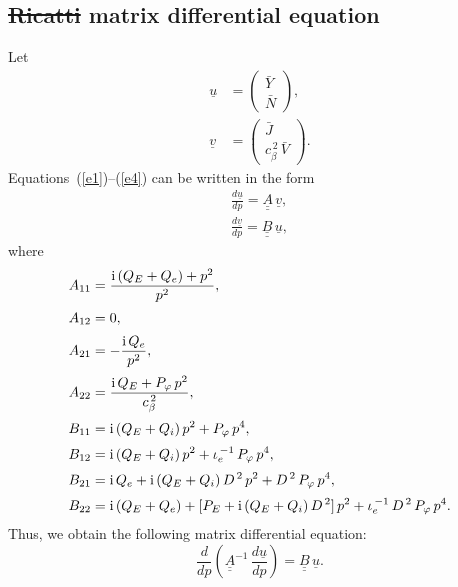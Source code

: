 \documentclass[12pt,prb,aps]{revtex4-1}
\providecommand{\DIFadd}[1]{{\protect\color{blue}\uwave{#1}}} %
\providecommand{\DIFdel}[1]{{\protect\color{red}\sout{#1}}}                      %
\providecommand{\DIFaddbegin}{} %
\providecommand{\DIFaddend}{} %
\providecommand{\DIFdelbegin}{} %
\providecommand{\DIFdelend}{} %
\begin{document}
\subsection{\DIFdelbegin \DIFdel{Ricatti }\DIFdelend \DIFaddbegin \DIFadd{Riccati }\DIFaddend matrix differential equation}
Let
\begin{align}
\underline{u}&= \left(\begin{array}{c}\bar{Y}\\\bar{N}\end{array}\right),\\[0.5ex]
\underline{v}&= \left(\begin{array}{c}\bar{J}\\c_\beta^{\,2}\,\bar{V}\end{array}\right).
\end{align}
Equations~(\ref{e1})--(\ref{e4}) can be written in the form 
\begin{align}
\frac{d\underline{u}}{dp}= \underline{\underline{A}}\,\underline{v},\\[0.5ex]
\frac{d\underline{v}}{dp}= \underline{\underline{B}}\,\underline{u},
\end{align}
where
\begin{align}
A_{11} &=  \frac{{\rm i}\,(Q_E+Q_e)+p^2}{p^2},\\[0.5ex]
A_{12}&=0,\\[0.5ex]
A_{21} &=- \frac{{\rm i}\,Q_e}{p^2},\\[0.5ex]
A_{22} &= \frac{{\rm i}\,Q_E + P_\varphi\,p^2}{c_\beta^{\,2}},\\[0.5ex]
B_{11} &= {\rm i}\,(Q_E+Q_i)\,p^2 + P_\varphi\,p^4,\\[0.5ex]
B_{12} &= {\rm i}\,(Q_E+Q_i)\,p^2 + \iota_e^{\,-1}\,P_\varphi\,p^4,\\[0.5ex]
B_{21}&= {\rm i}\,Q_e+ {\rm i}\,(Q_E+Q_i)\,D^{\,2}\,p^2 + D^{\,2}\,P_\varphi\,p^4,\\[0.5ex]
B_{22} & ={\rm i}\,(Q_E+Q_e) + [P_E + {\rm i}\,(Q_E +Q_i)\,D^{\,2}]\,p^2 + \iota_e^{\,-1}\,D^{\,2}\,P_\varphi\,p^4.
\end{align}
Thus, we obtain the following matrix differential equation: 
\begin{equation}\label{mat}
\frac{d}{dp}\!\left(\underline{\underline{A}}^{-1}\,\frac{d\underline{u}}{dp}\right) = \underline{\underline{B}}\,\underline{u}.
\end{equation}
\end{document}
